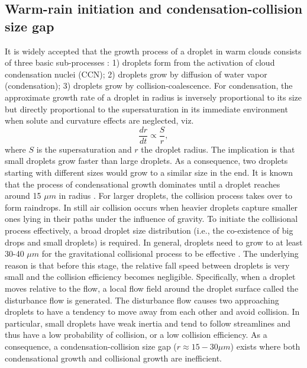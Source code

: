 \subsection{Warm-rain initiation and condensation-collision size gap}

It is widely accepted that the growth process of a droplet in warm clouds consists of three basic sub-processes \citep[e.g., ][]{Rogers1989} : 1) droplets form from the activation of cloud condensation nuclei (CCN); 2) droplets grow by diffusion of water vapor (condensation); 3) droplets grow by collision-coalescence. For condensation, the approximate growth rate of a droplet in radius is inversely proportional to its size but directly proportional to the supersaturation in its immediate environment when solute and curvature effects are neglected, viz.
\begin{equation}
\frac{dr}{dt}\propto \frac{S}{r},
\end{equation}
where $S$ is the supersaturation and $r$ the droplet radius. The implication is that small droplets grow faster than large droplets. As a consequence, two droplets starting with different sizes would grow to a similar size in the end. It is known that the process of condensational growth dominates until a droplet reaches around 15 $\mu m$ in radius \citep{Pruppacher1997}. For larger droplets, the collision process takes over to form raindrops. In still air collision occurs when heavier droplets capture smaller ones lying in their paths under the influence of gravity. To initiate the collisional process effectively, a broad droplet size distribution (i.e., the co-existence of big drops and small droplets) is required. In general, droplets need to grow to at least 30-40 $\mu m$ for the gravitational collisional process to be effective \citep{Mason1975, Grabowski2013}. The underlying reason is that before this stage, the relative fall speed between droplets is very small and the collision efficiency becomes negligible. Specifically, when a droplet moves relative to the flow, a local flow field around the droplet surface called the disturbance flow is generated. The disturbance flow causes two approaching droplets to have a tendency to move away from each other and avoid collision. In particular, small droplets have weak inertia and tend to follow streamlines and thus have a low probability of collision, or a low collision efficiency. As a consequence, a condensation-collision size gap ($r \approx 15-30 \mu m$) exists where both condensational growth and collisional growth are inefficient.

